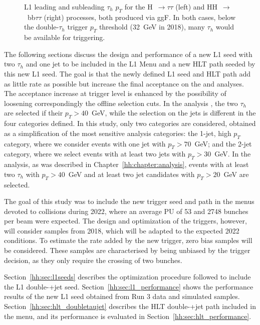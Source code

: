 \documentclass[../main.tex]{subfiles}
\begin{document}
\begin{figure}[h!]
\begin{center}
\end{center}
\caption[L1 $\tau_h$ $p_T$]{L1 leading and subleading $\tau_h$ $p_T$ for the H~$\to\tau\tau$ (left) and HH~$\to$~bb$\tau\tau$ (right) processes, both produced via ggF. In both cases, below the double-$\tau_h$ trigger $p_T$ threshold (32~GeV in 2018), many $\tau_h$ would be available for triggering.}
\label{hh:fig:trig_l1tau_pt}
\end{figure}

The following sections discuss the design and performance of a new L1 seed with two $\tau_h$ and one jet to be included in the L1 Menu and a new HLT path seeded by this new L1 seed. The goal is that the newly defined L1 seed and HLT path add as little rate as possible but increase the final acceptance on the \htt{} and \hhbbtt{} analyses. The acceptance increase at trigger level is enhanced by the possibility of loosening correspondingly the offline selection cuts. In the \htt{} analysis \cite{hh:htt_run2}, the two $\tau_h$ are selected if their $p_T > 40$~GeV, while the selection on the jets is different in the four categories defined. In this study, only two categories are considered, obtained as a simplification of the most sensitive analysis categories: the 1-jet, high $p_T$ category, where we consider events with one jet with $p_T > 70$~GeV; and the 2-jet category, where we select events with at least two jets with $p_T > 30$~GeV. In the \hhbbtt{} analysis, as was described in Chapter~\ref{hh:chapter:analysis}, events with at least two $\tau_h$ with $p_T>40$~GeV and at least two jet candidates with $p_T>20$~GeV are selected.

The goal of this study was to include the new trigger seed and path in the menus devoted to collisions during 2022, where an average PU of 53 and 2748 bunches per beam were expected. The design and optimization of the triggers, however, will consider samples from 2018, which will be adapted to the expected 2022 conditions. To estimate the rate added by the new trigger, zero bias samples will be considered. These samples are characterised by being unbiased by the trigger decision, as they only require the crossing of two bunches.

Section~\ref{hh:sec:l1seeds} describes the optimization procedure followed to include the L1 double-\tauh{}+jet seed. Section~\ref{hh:sec:l1_performance} shows the performance results of the new L1 seed obtained from Run 3 data and simulated samples. Section~\ref{hh:sec:hlt_doubletaujet} describes the HLT double-\tauh{}+jet path included in the menu, and its performance is evaluated in Section~\ref{hh:sec:hlt_performance}.
\end{document}
